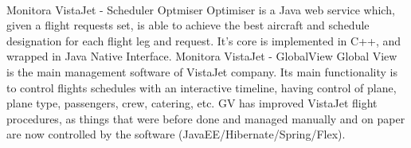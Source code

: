 \documentclass[]{friggeri-cv}
\begin{document}
\begin{entrylist}
\end{entrylist}
\\
\begin{entrylist}
 \entry
    {Monitora}
    {VistaJet - Scheduler Optmiser }
    {\href{}{}}
    {Optimiser is a Java web service which, given a flight requests set, is able to achieve the best aircraft and schedule designation for each flight leg and request. It's core is implemented in C++, and wrapped in Java Native Interface.}
  \entry
    {Monitora}
    {VistaJet - GlobalView }
    {\href{}{}}
    {Global View is the main management software of VistaJet company. Its main functionality is to control flights schedules with an interactive timeline, having control of plane, plane type, passengers, crew, catering, etc. GV has improved VistaJet flight procedures, as things that were before done and managed manually and on paper are now controlled by the software (JavaEE/Hibernate/Spring/Flex).}   

\begin{comment}
  \entry
    {Simples}
    {Let's - Vistoria }
    {\href{}{}}
    {Android app for car survey with a web module for overall management of performed (and to perform) inspections. (Native Android)}
    
  \entry
    {Cast IT}
    {SEFIN - Declaração Eletrônica de Serviços de Instituições Financeiras (DESIF) }
    {\href{}{https://desif.prefeitura.sp.gov.br/}}
    {Developed to SEFIN (Finance Department of São Paulo), DESIF's main goal is to validate statements of statewide financial institutions, performing in a few minutes documents validations that used to take weeks when done by human hands. (Java EE7) }
\end{comment}

\end{entrylist}
\end{document}
